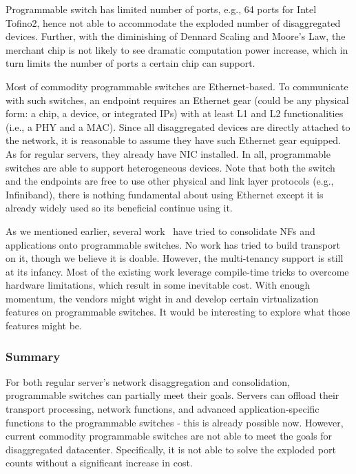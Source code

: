 Programmable switch has limited number of ports,
e.g., 64 ports for Intel Tofino2, hence not able to
accommodate the exploded number of disaggregated devices.
Further, with the diminishing of Dennard Scaling and Moore's Law,
the merchant chip is not likely to see dramatic computation power increase,
which in turn limits the number of ports a certain chip can support.

Most of commodity programmable switches are Ethernet-based.
To communicate with such switches,
an endpoint requires an Ethernet gear
(could be any physical form: a chip, a device, or integrated IPs)
with at least L1 and L2 functionalities (i.e., a PHY and a MAC). 
Since all disaggregated devices are directly attached to the network,
it is reasonable to assume they have such Ethernet gear equipped.
As for regular servers, they already have NIC installed.
In all, programmable switches are able to support heterogeneous devices.
Note that both the switch and the endpoints are free to
use other physical and link layer protocols (e.g., Infiniband),
there is nothing fundamental about using Ethernet except it is
already widely used so its beneficial continue using it.

As we mentioned earlier, several work~\cite{tea-sigcomm20,active-hotnets20,wang-hotcloud20}
have tried to consolidate NFs and applications onto programmable switches.
No work has tried to build transport on it, though we believe it is doable.
However, the multi-tenancy support is still at its infancy.
Most of the existing work leverage compile-time tricks to
overcome hardware limitations, which result in some inevitable cost.
With enough momentum, the vendors might wight in and develop certain
virtualization features on programmable switches.
It would be interesting to explore what those features might be.

\subsubsection{Summary}

For both regular server's network disaggregation and consolidation,
programmable switches can partially meet their goals.
Servers can offload their transport processing,
network functions, and advanced application-specific functions to
the programmable switches -  this is already possible now.
However, current commodity programmable switches
are not able to meet the goals for disaggregated datacenter.
Specifically, it is not able to solve the exploded port counts
without a significant increase in cost.


